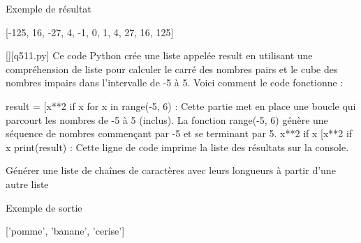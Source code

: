 Exemple de résultat

[-125, 16, -27, 4, -1, 0, 1, 4, 27, 16, 125]
        \par
        \begin{solution}
            \renewcommand{\nomfichier}{q511.py}
            \pythonfile{\chemincode \nomfichier}[][\nomfichier]
            Ce code Python crée une liste appelée result en utilisant une compréhension de liste pour calculer le carré des nombres pairs et le cube des nombres impairs dans l'intervalle de -5 à 5. Voici comment le code fonctionne :

    result = [x**2 if x %
        for x in range(-5, 6) : Cette partie met en place une boucle qui parcourt les nombres de -5 à 5 (inclus). La fonction range(-5, 6) génère une séquence de nombres commençant par -5 et se terminant par 5.
        x**2 if x %
        [x**2 if x %
    print(result) : Cette ligne de code imprime la liste des résultats sur la console.
        \end{solution}
        

        \question
        Générer une liste de chaînes de caractères avec leurs longueurs à partir d'une autre liste

Exemple de sortie

['pomme', 'banane', 'cerise']

